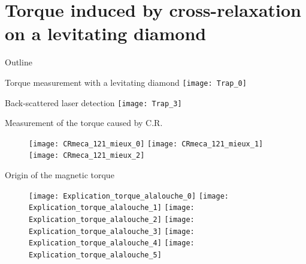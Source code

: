 \documentclass{beamer}
\begin{document}
\section{Torque induced by cross-relaxation on a levitating diamond}
\begin{frame}{Outline}
\tableofcontents[currentsection]
\end{frame}
\begin{frame}{Torque measurement with a levitating diamond}
\centering
\texttt{[image: Trap\_0]}%
\end{frame}
\begin{frame}{Back-scattered laser detection}
\centering
\texttt{[image: Trap\_3]}%
\end{frame}
\begin{frame}{Measurement of the torque caused by C.R.}
\begin{figure}
    \begin{overprint}
    \texttt{[image: CRmeca\_121\_mieux\_0]}
    \texttt{[image: CRmeca\_121\_mieux\_1]}
    \texttt{[image: CRmeca\_121\_mieux\_2]}
    \end{overprint}
\end{figure}
\end{frame}
\begin{frame}{Origin of the magnetic torque}
\begin{figure}
    \begin{overprint}
    \texttt{[image: Explication\_torque\_alalouche\_0]}
    \texttt{[image: Explication\_torque\_alalouche\_1]}
    \texttt{[image: Explication\_torque\_alalouche\_2]}
    \texttt{[image: Explication\_torque\_alalouche\_3]}
    \texttt{[image: Explication\_torque\_alalouche\_4]}
    \texttt{[image: Explication\_torque\_alalouche\_5]}
    \end{overprint}
\end{figure}
\end{frame}
\end{document}
